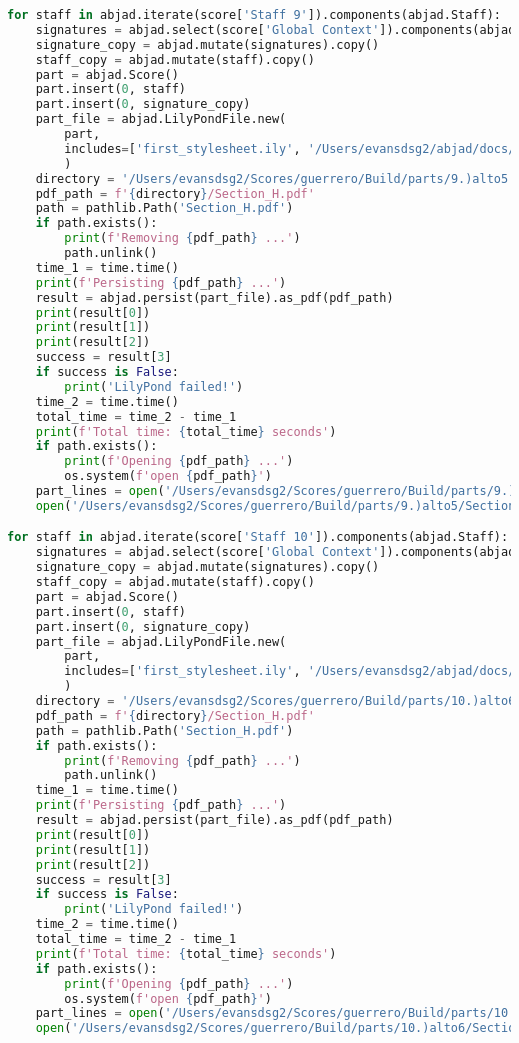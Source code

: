 \begin{lstlisting}[language=Python, caption=Invocation Source Code]
for staff in abjad.iterate(score['Staff 9']).components(abjad.Staff):
    signatures = abjad.select(score['Global Context']).components(abjad.Staff)
    signature_copy = abjad.mutate(signatures).copy()
    staff_copy = abjad.mutate(staff).copy()
    part = abjad.Score()
    part.insert(0, staff)
    part.insert(0, signature_copy)
    part_file = abjad.LilyPondFile.new(
        part,
        includes=['first_stylesheet.ily', '/Users/evansdsg2/abjad/docs/source/_stylesheets/abjad.ily'],
        )
    directory = '/Users/evansdsg2/Scores/guerrero/Build/parts/9.)alto5'
    pdf_path = f'{directory}/Section_H.pdf'
    path = pathlib.Path('Section_H.pdf')
    if path.exists():
        print(f'Removing {pdf_path} ...')
        path.unlink()
    time_1 = time.time()
    print(f'Persisting {pdf_path} ...')
    result = abjad.persist(part_file).as_pdf(pdf_path)
    print(result[0])
    print(result[1])
    print(result[2])
    success = result[3]
    if success is False:
        print('LilyPond failed!')
    time_2 = time.time()
    total_time = time_2 - time_1
    print(f'Total time: {total_time} seconds')
    if path.exists():
        print(f'Opening {pdf_path} ...')
        os.system(f'open {pdf_path}')
    part_lines = open('/Users/evansdsg2/Scores/guerrero/Build/parts/9.)alto5/Section_H.ly').readlines()
    open('/Users/evansdsg2/Scores/guerrero/Build/parts/9.)alto5/Section_H.ly', 'w').writelines(part_lines[15:-1])

for staff in abjad.iterate(score['Staff 10']).components(abjad.Staff):
    signatures = abjad.select(score['Global Context']).components(abjad.Staff)
    signature_copy = abjad.mutate(signatures).copy()
    staff_copy = abjad.mutate(staff).copy()
    part = abjad.Score()
    part.insert(0, staff)
    part.insert(0, signature_copy)
    part_file = abjad.LilyPondFile.new(
        part,
        includes=['first_stylesheet.ily', '/Users/evansdsg2/abjad/docs/source/_stylesheets/abjad.ily'],
        )
    directory = '/Users/evansdsg2/Scores/guerrero/Build/parts/10.)alto6'
    pdf_path = f'{directory}/Section_H.pdf'
    path = pathlib.Path('Section_H.pdf')
    if path.exists():
        print(f'Removing {pdf_path} ...')
        path.unlink()
    time_1 = time.time()
    print(f'Persisting {pdf_path} ...')
    result = abjad.persist(part_file).as_pdf(pdf_path)
    print(result[0])
    print(result[1])
    print(result[2])
    success = result[3]
    if success is False:
        print('LilyPond failed!')
    time_2 = time.time()
    total_time = time_2 - time_1
    print(f'Total time: {total_time} seconds')
    if path.exists():
        print(f'Opening {pdf_path} ...')
        os.system(f'open {pdf_path}')
    part_lines = open('/Users/evansdsg2/Scores/guerrero/Build/parts/10.)alto6/Section_H.ly').readlines()
    open('/Users/evansdsg2/Scores/guerrero/Build/parts/10.)alto6/Section_H.ly', 'w').writelines(part_lines[15:-1])


\end{lstlisting}
